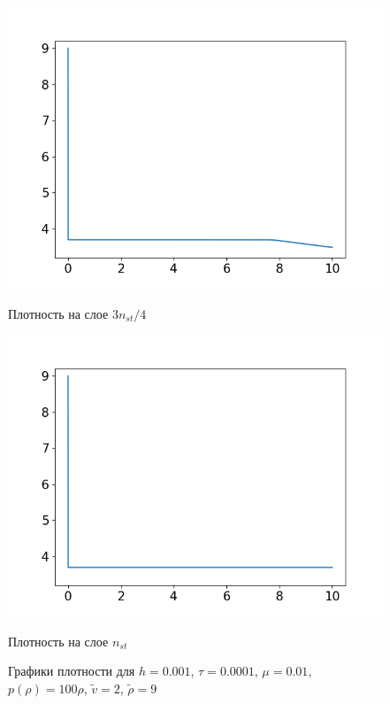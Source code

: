 \begin{figure}[h]
\begin{minipage}[h]{0.47\linewidth}
		\includegraphics[width=1\linewidth]{pics/task4/34h_2.png} 
		\caption{Плотность на слое $3n_{st} / 4$}
	\end{minipage}
	\hfill
	\begin{minipage}[h]{0.47\linewidth}
		\centering
		\includegraphics[width=1\linewidth]{pics/task4/44h_2.png} 
		\caption{Плотность на слое $n_{st}$}
	\end{minipage}
	\caption{Графики плотности для $h = 0.001$, $\tau = 0.0001$, $\mu = 0.01$, $p(\rho) = 100\rho$, $\tilde{v} = 2$, $\tilde{\rho} = 9 $}
\end{figure}

